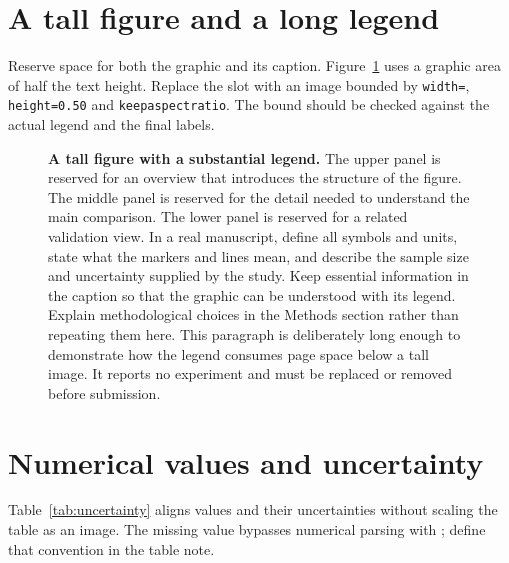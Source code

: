 \documentclass[11pt,a4paper]{article}
\begin{document}
\section{A tall figure and a long legend}
Reserve space for both the graphic and its caption. Figure~\ref{fig:tall} uses
a graphic area of half the text height. Replace the slot with an image
bounded by \texttt{width=\string\linewidth},
\texttt{height=0.50\string\textheight} and \texttt{keepaspectratio}.
The bound should be checked against the actual legend and the final labels.

\begin{figure}[htbp]
\centering
{}
\caption{\textbf{A tall figure with a substantial legend.} The upper panel is
reserved for an overview that introduces the structure of the figure. The
middle panel is reserved for the detail needed to understand the main
comparison. The lower panel is reserved for a related validation view. In a
real manuscript, define all symbols and units, state what the markers and
lines mean, and describe the sample size and uncertainty supplied by the
study. Keep essential information in the caption so that the graphic can be
understood with its legend. Explain methodological choices in the Methods
section rather than repeating them here. This paragraph is deliberately long
enough to demonstrate how the legend consumes page space below a tall image.
It reports no experiment and must be replaced or removed before submission.}
\label{fig:tall}
\end{figure}
\clearpage

\section{Numerical values and uncertainty}
Table~\ref{tab:uncertainty} aligns values and their uncertainties without
scaling the table as an image. The missing value bypasses numerical parsing
with \texttt{\string\multicolumn}; define that convention in the table note.
\end{document}
